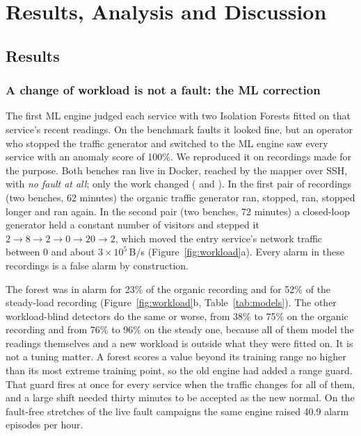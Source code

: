 \clearpage
\chapter[RESULTS, ANALYSIS AND DISCUSSION]{Results, Analysis and Discussion}
\label{ch:results}

\section{Results}\label{sec:resultsmain}

\subsection{A change of workload is not a fault: the ML correction}
\label{sec:workloadres}
The first ML engine judged each service with two Isolation Forests fitted on that service's recent readings. On the benchmark faults it looked fine, but an operator who stopped the traffic generator and switched to the ML engine saw every service with an anomaly score of 100\%. We reproduced it on recordings made for the purpose. Both benches ran live in Docker, reached by the mapper over SSH, with \emph{no fault at all}; only the work changed ( and ). In the first pair of recordings (two benches, 62 minutes) the organic traffic generator ran, stopped, ran, stopped longer and ran again. In the second pair (two benches, 72 minutes) a closed-loop generator held a constant number of visitors and stepped it $2 \to 8 \to 2 \to 0 \to 20 \to 2$, which moved the entry service's network traffic between 0 and about $3 \times 10^{5}$\,B/s (Figure~\ref{fig:workload}a). Every alarm in these recordings is a false alarm by construction.

The forest was in alarm for 23\% of the organic recording and for 52\% of the steady-load recording (Figure~\ref{fig:workload}b, Table~\ref{tab:models}). The other workload-blind detectors do the same or worse, from 38\% to 75\% on the organic recording and from 76\% to 96\% on the steady one, because all of them model the readings themselves and a new workload is outside what they were fitted on. It is not a tuning matter. A forest scores a value beyond its training range no higher than its most extreme training point, so the old engine had added a range guard. That guard fires at once for every service when the traffic changes for all of them, and a large shift needed thirty minutes to be accepted as the new normal. On the fault-free stretches of the live fault campaigns the same engine raised 40.9 alarm episodes per hour.

